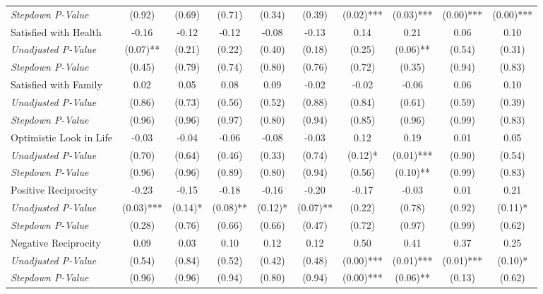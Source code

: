\begin{tabular}{l c c c c c c c c c}
\quad \textit{Stepdown P-Value} & (0.92) & (0.69) & (0.71) & (0.34) & (0.39) & (0.02)*** & (0.03)*** & (0.00)*** & (0.00)*** \\
Satisfied with Health & -0.16 & -0.12 & -0.12 & -0.08 & -0.13 & 0.14 & 0.21 & 0.06 & 0.10 \\
\quad \textit{Unadjusted P-Value} & (0.07)** & (0.21) & (0.22) & (0.40) & (0.18) & (0.25) & (0.06)** & (0.54) & (0.31) \\
\quad \textit{Stepdown P-Value} & (0.45) & (0.79) & (0.74) & (0.80) & (0.76) & (0.72) & (0.35) & (0.94) & (0.83) \\
Satisfied with Family & 0.02 & 0.05 & 0.08 & 0.09 & -0.02 & -0.02 & -0.06 & 0.06 & 0.10 \\
\quad \textit{Unadjusted P-Value} & (0.86) & (0.73) & (0.56) & (0.52) & (0.88) & (0.84) & (0.61) & (0.59) & (0.39) \\
\quad \textit{Stepdown P-Value} & (0.96) & (0.96) & (0.97) & (0.80) & (0.94) & (0.85) & (0.96) & (0.99) & (0.83) \\
Optimistic Look in Life & -0.03 & -0.04 & -0.06 & -0.08 & -0.03 & 0.12 & 0.19 & 0.01 & 0.05 \\
\quad \textit{Unadjusted P-Value} & (0.70) & (0.64) & (0.46) & (0.33) & (0.74) & (0.12)* & (0.01)*** & (0.90) & (0.54) \\
\quad \textit{Stepdown P-Value} & (0.96) & (0.96) & (0.89) & (0.80) & (0.94) & (0.56) & (0.10)** & (0.99) & (0.83) \\
Positive Reciprocity & -0.23 & -0.15 & -0.18 & -0.16 & -0.20 & -0.17 & -0.03 & 0.01 & 0.21 \\
\quad \textit{Unadjusted P-Value} & (0.03)*** & (0.14)* & (0.08)** & (0.12)* & (0.07)** & (0.22) & (0.78) & (0.92) & (0.11)* \\
\quad \textit{Stepdown P-Value} & (0.28) & (0.76) & (0.66) & (0.66) & (0.47) & (0.72) & (0.97) & (0.99) & (0.62) \\
Negative Reciprocity & 0.09 & 0.03 & 0.10 & 0.12 & 0.12 & 0.50 & 0.41 & 0.37 & 0.25 \\
\quad \textit{Unadjusted P-Value} & (0.54) & (0.84) & (0.52) & (0.42) & (0.48) & (0.00)*** & (0.01)*** & (0.01)*** & (0.10)* \\
\quad \textit{Stepdown P-Value} & (0.96) & (0.96) & (0.94) & (0.80) & (0.94) & (0.00)*** & (0.06)** & (0.13) & (0.62) \\
\bottomrule
\end{tabular}
